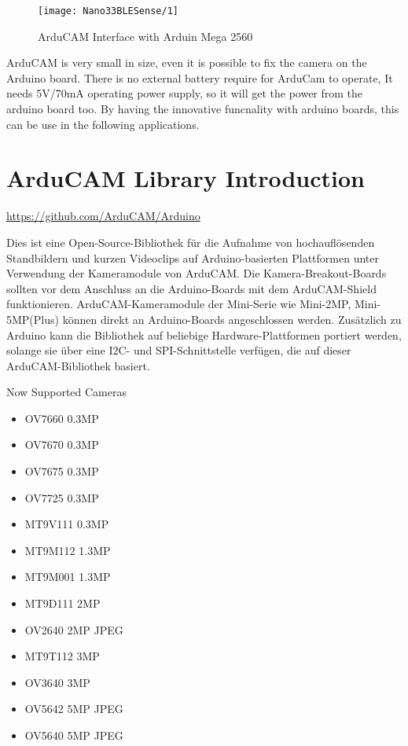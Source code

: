 \begin{figure}[ht]
    \centering
    \texttt{[image: Nano33BLESense/1]}
    \caption{ArduCAM Interface with Arduin Mega 2560} 
    \label{1}
\end{figure}

ArduCAM is very small in size, even it is possible to fix the camera on the Arduino board. There is no external battery require for ArduCam to operate, It needs 5V/70mA operating power supply, so it will get the power from the arduino board too. By having the innovative funcnality with arduino boards, this can be use in the following applications.



\section{ArduCAM Library Introduction}

\url{https://github.com/ArduCAM/Arduino}


Dies ist eine Open-Source-Bibliothek für die Aufnahme von hochauflösenden Standbildern und kurzen Videoclips auf Arduino-basierten Plattformen unter Verwendung der Kameramodule von ArduCAM.
Die Kamera-Breakout-Boards sollten vor dem Anschluss an die Arduino-Boards mit dem ArduCAM-Shield funktionieren.
ArduCAM-Kameramodule der Mini-Serie wie Mini-2MP, Mini-5MP(Plus) können direkt an Arduino-Boards angeschlossen werden.
Zusätzlich zu Arduino kann die Bibliothek auf beliebige Hardware-Plattformen portiert werden, solange sie über eine I2C- und SPI-Schnittstelle verfügen, die auf dieser ArduCAM-Bibliothek basiert.

\bigskip

Now Supported Cameras

\begin{itemize}
  \item OV7660 0.3MP
  \item OV7670 0.3MP
  \item OV7675 0.3MP
  \item OV7725 0.3MP
  \item MT9V111 0.3MP
  \item MT9M112 1.3MP
  \item MT9M001 1.3MP
  \item MT9D111 2MP
  \item OV2640 2MP JPEG
  \item MT9T112 3MP
  \item OV3640 3MP
  \item OV5642 5MP JPEG
  \item OV5640 5MP JPEG
\end{itemize}

